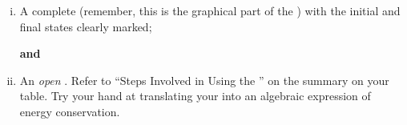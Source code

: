 
\begin{enumerate}[(i)]
	\item A complete \TempGraph{} (remember, this is the graphical part of the \ThreePhaseModel{}) with the initial and final states clearly marked; 
	
	{\bfseries and }
	
	\item An {\em open} \EnergyDiagram{}. Refer to ``Steps Involved in Using the \EnergyDiagram'' on the \EnergyInteractionModel{} summary on your table. Try your hand at translating your \EnergyDiagram{} into an algebraic expression of energy conservation.
\end{enumerate}

